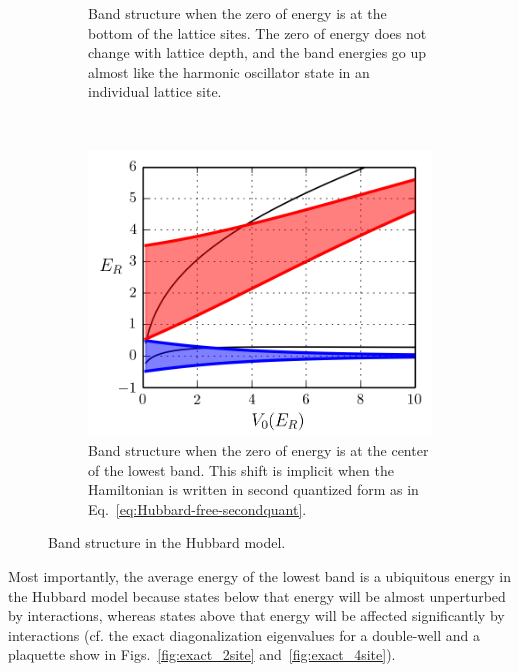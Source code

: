\begin{itemize}
\begin{figure}
\begin{subfigure}[t]{0.4\textwidth}
\caption{\small Band structure when the zero of energy is at the bottom of the
lattice sites.  The zero of energy does not change with lattice depth, and the
band energies go up almost like the harmonic oscillator state in an individual
lattice site.  }
                \label{fig:Hubbard-firstquant}
        \end{subfigure}%
        ~~ %
        \begin{subfigure}[t]{0.4\textwidth}
		\includegraphics[width=\textwidth]{../figures/lda_evap/bands1d_V0_secondquant.png}
\caption{\small Band structure when the zero of energy is at the center of the lowest
band.  This shift is implicit when the Hamiltonian is written in second
quantized form as in Eq.~\ref{eq:Hubbard-free-secondquant}.  }
                \label{fig:Hubbard-secondquant}
        \end{subfigure}
	\caption{\small Band structure in the Hubbard model.  }
\label{fig:Hubbard-first-second}
\end{figure}

Most importantly, the average energy of the lowest band is a ubiquitous energy
in the Hubbard model because states below that energy will be almost
unperturbed by interactions, whereas states above that energy will be affected
significantly by interactions (cf. the exact diagonalization eigenvalues for a
double-well and a plaquette show in Figs.~\ref{fig:exact_2site}
and~\ref{fig:exact_4site}). 


\end{itemize}
